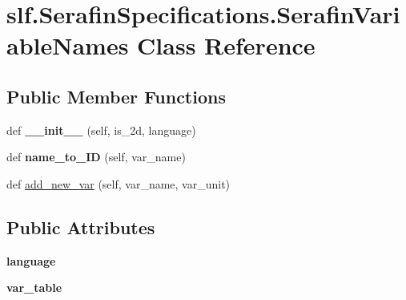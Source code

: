 \hypertarget{classslf_1_1_serafin_specifications_1_1_serafin_variable_names}{}\section{slf.\+Serafin\+Specifications.\+Serafin\+Variable\+Names Class Reference}
\label{classslf_1_1_serafin_specifications_1_1_serafin_variable_names}
\subsection*{Public Member Functions}
\begin{DoxyCompactItemize}
\item 
def {\bfseries \+\_\+\+\_\+init\+\_\+\+\_\+} (self, is\+\_\+2d, language)\hypertarget{classslf_1_1_serafin_specifications_1_1_serafin_variable_names_a7d8471e92fccc243bb1666ce9eff076f}{}\label{classslf_1_1_serafin_specifications_1_1_serafin_variable_names_a7d8471e92fccc243bb1666ce9eff076f}

\item 
def {\bfseries name\+\_\+to\+\_\+\+ID} (self, var\+\_\+name)\hypertarget{classslf_1_1_serafin_specifications_1_1_serafin_variable_names_ae57d59239481d54929bc3ef3009da6f2}{}\label{classslf_1_1_serafin_specifications_1_1_serafin_variable_names_ae57d59239481d54929bc3ef3009da6f2}

\item 
def \hyperlink{classslf_1_1_serafin_specifications_1_1_serafin_variable_names_aca0bb03ec582c43f5be58cc32f06b92e}{add\+\_\+new\+\_\+var} (self, var\+\_\+name, var\+\_\+unit)
\end{DoxyCompactItemize}
\subsection*{Public Attributes}
\begin{DoxyCompactItemize}
\item 
{\bfseries language}\hypertarget{classslf_1_1_serafin_specifications_1_1_serafin_variable_names_aafd31e10187149bc2d70cadaf25a3f06}{}\label{classslf_1_1_serafin_specifications_1_1_serafin_variable_names_aafd31e10187149bc2d70cadaf25a3f06}

\item 
{\bfseries var\+\_\+table}\hypertarget{classslf_1_1_serafin_specifications_1_1_serafin_variable_names_ac2c92428a723f74e395ce68e9522fe26}{}\label{classslf_1_1_serafin_specifications_1_1_serafin_variable_names_ac2c92428a723f74e395ce68e9522fe26}

\end{DoxyCompactItemize}


